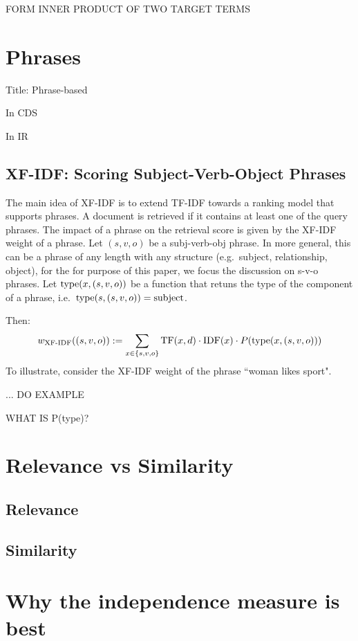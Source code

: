 FORM INNER PRODUCT OF TWO TARGET TERMS


\section{Phrases}

Title: Phrase-based


In CDS


In IR


\subsection{XF-IDF: Scoring Subject-Verb-Object Phrases}

The main idea of XF-IDF \cite{Azzam/etal:SIGMOD:KEYS:2010} is to extend
TF-IDF towards a ranking model that supports phrases.
%
A document is retrieved if it contains at least one of the query phrases.
%
The impact of a phrase on the retrieval score is given by the XF-IDF
weight of a phrase.
%
Let $(s,v,o)$ be a subj-verb-obj phrase.
In more general, this can be a phrase of any length with any structure
(e.g.~subject, relationship, object), for the for purpose of this paper,
we focus the discussion on s-v-o phrases.
%
Let $\textmd{type}(x,(s,v,o))$ be a function that retuns the type of the component
of a phrase, i.e.~$\textmd{type}(s,(s,v,o))=\textmd{subject}$.

Then:
\[
w_\textmd{XF-IDF}((s,v,o)) :=
\sum_{x \in \{s,v,o\}} \textmd{TF}(x,d) \cdot \textmd{IDF}(x) \cdot P(\textmd{type}(x,(s,v,o)))
\]
To illustrate, consider the XF-IDF weight of the phrase ``woman likes sport".

...
DO EXAMPLE


WHAT IS P(type)?

\section{Relevance vs Similarity}

\subsection{Relevance}

\subsection{Similarity}

\section{Why the independence measure is best}

